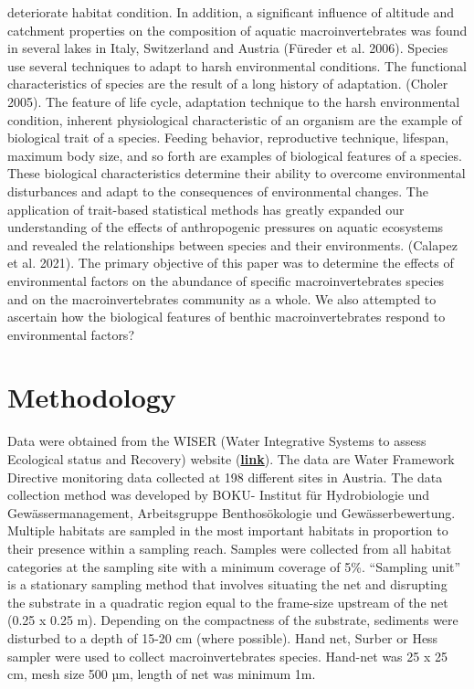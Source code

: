\documentclass[
]{article}
\begin{document}
deteriorate habitat condition. In addition, a significant influence of
altitude and catchment properties on the composition of aquatic
macroinvertebrates was found in several lakes in Italy, Switzerland and
Austria (Füreder et al. 2006). Species use several techniques to adapt
to harsh environmental conditions. The functional characteristics of
species are the result of a long history of adaptation. (Choler 2005).
The feature of life cycle, adaptation technique to the harsh
environmental condition, inherent physiological characteristic of an
organism are the example of biological trait of a species. Feeding
behavior, reproductive technique, lifespan, maximum body size, and so
forth are examples of biological features of a species. These biological
characteristics determine their ability to overcome environmental
disturbances and adapt to the consequences of environmental changes. The
application of trait-based statistical methods has greatly expanded our
understanding of the effects of anthropogenic pressures on aquatic
ecosystems and revealed the relationships between species and their
environments. (Calapez et al. 2021). The primary objective of this paper
was to determine the effects of environmental factors on the abundance
of specific macroinvertebrates species and on the macroinvertebrates
community as a whole. We also attempted to ascertain how the biological
features of benthic macroinvertebrates respond to environmental factors?

\hypertarget{methodology}{%
\section{Methodology}\label{methodology}}

Data were obtained from the WISER (Water Integrative Systems to assess
Ecological status and Recovery) website
(\textbf{\href{http://www.wiser.eu/results/method-database/detail.php?id=49\&qst=country\%5B\%5D\%3DAustria\%26category\%5B\%5D\%3DRivers\%26bqe\%5B\%5D\%3DBenthic\%2520Invertebrates}{link}}).
The data are Water Framework Directive monitoring data collected at 198
different sites in Austria. The data collection method was developed by
BOKU- Institut für Hydrobiologie und Gewässermanagement, Arbeitsgruppe
Benthosökologie und Gewässerbewertung. Multiple habitats are sampled in
the most important habitats in proportion to their presence within a
sampling reach. Samples were collected from all habitat categories at
the sampling site with a minimum coverage of 5\%. ``Sampling unit'' is a
stationary sampling method that involves situating the net and
disrupting the substrate in a quadratic region equal to the frame-size
upstream of the net (0.25 x 0.25 m). Depending on the compactness of the
substrate, sediments were disturbed to a depth of 15-20 cm (where
possible). Hand net, Surber or Hess sampler were used to collect
macroinvertebrates species. Hand-net was 25 x 25 cm, mesh size 500 µm,
length of net was minimum 1m.
\end{document}
